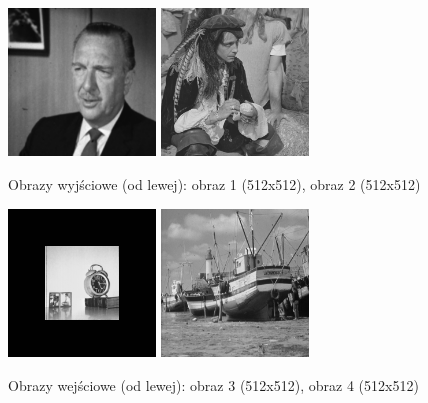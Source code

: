 \documentclass[final,a4paper,openany,12pt]{mwbk}
\begin{document}
\begin{figure}[H]
	\begin{center}
		\includegraphics[width=0.35\textwidth]{gentelman_gray_unificationRas_result}
		\includegraphics[width=0.35\textwidth]{pirate_gray_unificationRas_result}
	\end{center}
	\caption{Obrazy wyjściowe (od lewej): obraz 1 (512x512), obraz 2 (512x512)}
\end{figure}

\begin{figure}[H]
	\begin{center}
		\includegraphics[width=0.35\textwidth]{clock_gray_unificationGeo_result}
		\includegraphics[width=0.35\textwidth]{boat_gray_unificationGeo_result}
	\end{center}
	\caption{Obrazy wejściowe (od lewej): obraz 3 (512x512), obraz 4 (512x512)}
\end{figure}
\end{document}
